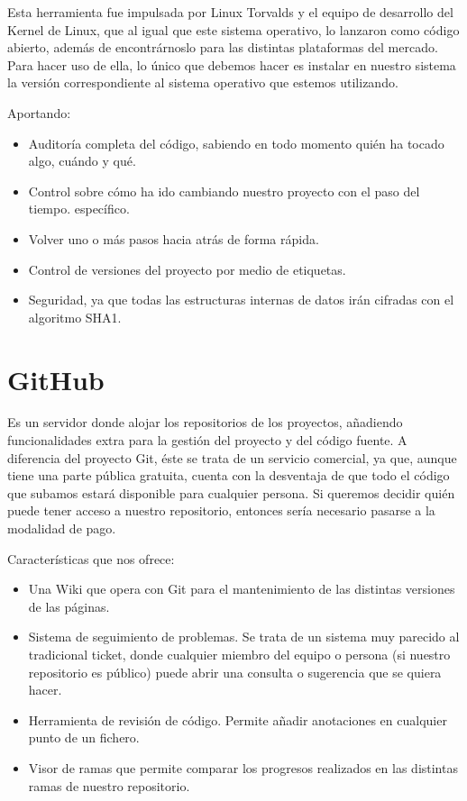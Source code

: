 \documentclass[12pt,letterpaper]{article}
\begin{document}
Esta herramienta fue impulsada por Linux Torvalds y el equipo de desarrollo del Kernel de Linux, que al igual que este sistema operativo, lo lanzaron como código abierto, además de encontrárnoslo para las distintas plataformas del mercado. Para hacer uso de ella, lo único que debemos hacer es instalar en nuestro sistema la versión correspondiente al sistema operativo que estemos utilizando. 

Aportando:

\begin{itemize}
    \item Auditoría completa del código, sabiendo en todo momento quién ha tocado algo, cuándo y qué. 
    \item Control sobre cómo ha ido cambiando nuestro proyecto con el paso del tiempo.  específico.
    \item Volver uno o más pasos hacia atrás de forma rápida. 
    \item Control de versiones del proyecto por medio de etiquetas.
    \item Seguridad, ya que todas las estructuras internas de datos irán cifradas con el algoritmo SHA1.
\end{itemize}


\section{GitHub}
Es un servidor donde alojar los repositorios de los proyectos, añadiendo funcionalidades extra para la gestión del proyecto y del código fuente. A diferencia del proyecto Git, éste se trata de un servicio comercial, ya que, aunque tiene una parte pública gratuita, cuenta con la desventaja de que todo el código que subamos estará disponible para cualquier persona. Si queremos decidir quién puede tener acceso a nuestro repositorio, entonces sería necesario pasarse a la modalidad de pago. 

Características que nos ofrece:

\begin{itemize}
    \item Una Wiki que opera con Git para el mantenimiento de las distintas versiones de las páginas.
    \item Sistema de seguimiento de problemas. Se trata de un sistema muy parecido al tradicional ticket, donde cualquier miembro del equipo o persona (si nuestro repositorio es público) puede abrir una consulta o sugerencia que se quiera hacer.
    \item Herramienta de revisión de código. Permite añadir anotaciones en cualquier punto de un fichero. 
    \item Visor de ramas que permite comparar los progresos realizados en las distintas ramas de nuestro repositorio.
\end{itemize}
\end{document}
